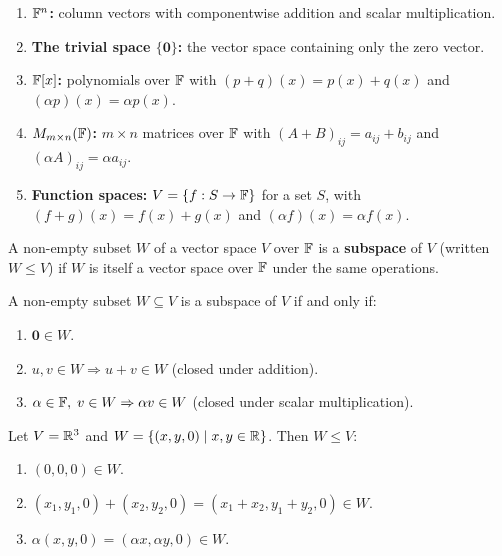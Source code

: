 \begin{exbox}
\begin{enumerate}
    \item \textbf{$\mathbb{F}^n$:} column vectors with componentwise addition and scalar
          multiplication.
    \item \textbf{The trivial space $\{\mathbf{0}\}$:} the vector space containing
          only the zero vector.
    \item \textbf{$\mathbb{F}[x]$:} polynomials over $\mathbb{F}$ with
          $(p+q)(x)=p(x)+q(x)$ and $(\alpha p)(x)=\alpha p(x)$.
    \item \textbf{$M_{m\times n}(\mathbb{F})$:} $m\times n$ matrices over $\mathbb{F}$ with
          $(A+B)_{ij}=a_{ij}+b_{ij}$ and $(\alpha A)_{ij}=\alpha a_{ij}$.
    \item \textbf{Function spaces:} $V=\{f:S\to\mathbb{F}\}$ for a set $S$, with
          $(f+g)(x)=f(x)+g(x)$ and $(\alpha f)(x)=\alpha f(x)$.
\end{enumerate}
\end{exbox}

\begin{defbox}
A non-empty subset $W$ of a vector space $V$ over $\mathbb{F}$ is a \textbf{subspace}
of $V$ (written $W\leq V$) if $W$ is itself a vector space over $\mathbb{F}$ under the
same operations.
\end{defbox}

\begin{propbox}
A non-empty subset $W\subseteq V$ is a subspace of $V$ if and only if:
\begin{enumerate}[label=(\roman*)]
    \item $\mathbf{0}\in W$.
    \item $u,v\in W \Rightarrow u+v\in W$ (closed under addition).
    \item $\alpha\in\mathbb{F},\; v\in W \Rightarrow \alpha v\in W$ (closed under scalar
          multiplication).
\end{enumerate}
\end{propbox}

\begin{exbox}
Let $V=\mathbb{R}^3$ and $W=\{(x,y,0)\mid x,y\in\mathbb{R}\}$.  Then $W\leq V$:
\begin{enumerate}[label=(\roman*)]
    \item $(0,0,0)\in W$. \checkmark
    \item $(x_1,y_1,0)+(x_2,y_2,0)=(x_1+x_2,y_1+y_2,0)\in W$. \checkmark
    \item $\alpha(x,y,0)=(\alpha x,\alpha y,0)\in W$. \checkmark
\end{enumerate}
\end{exbox}

